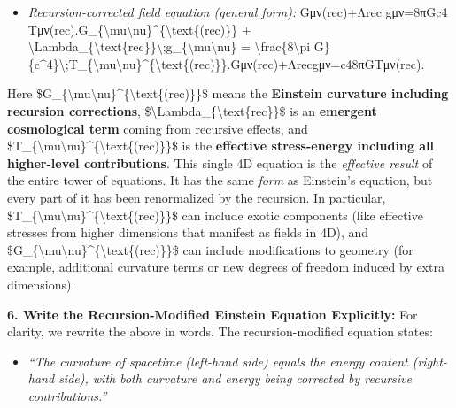\documentclass[
]{article}
\begin{document}
\begin{itemize}
\item
  \emph{Recursion-corrected field equation (general form):}
  Gμν(rec)+Λrec  gμν=8πGc4  Tμν(rec).G\_\{\textbackslash mu\textbackslash nu\}\^{}\{\textbackslash text\{(rec)\}\}
  +
  \textbackslash Lambda\_\{\textbackslash text\{rec\}\}\textbackslash;g\_\{\textbackslash mu\textbackslash nu\}
  = \textbackslash frac\{8\textbackslash pi
  G\}\{c\^{}4\}\textbackslash;T\_\{\textbackslash mu\textbackslash nu\}\^{}\{\textbackslash text\{(rec)\}\}.Gμν(rec)\hspace{0pt}+Λrec\hspace{0pt}gμν\hspace{0pt}=c48πG\hspace{0pt}Tμν(rec)\hspace{0pt}.
\end{itemize}

Here
\$G\_\{\textbackslash mu\textbackslash nu\}\^{}\{\textbackslash text\{(rec)\}\}\$
means the \textbf{Einstein curvature including recursion corrections},
\$\textbackslash Lambda\_\{\textbackslash text\{rec\}\}\$ is an
\textbf{emergent cosmological term} coming from recursive effects, and
\$T\_\{\textbackslash mu\textbackslash nu\}\^{}\{\textbackslash text\{(rec)\}\}\$
is the \textbf{effective stress-energy including all higher-level
contributions}\hspace{0pt}. This single 4D equation is the
\emph{effective result} of the entire tower of equations. It has the
same \emph{form} as Einstein's equation, but every part of it has been
renormalized by the recursion. In particular,
\$T\_\{\textbackslash mu\textbackslash nu\}\^{}\{\textbackslash text\{(rec)\}\}\$
can include exotic components (like effective stresses from higher
dimensions that manifest as fields in 4D), and
\$G\_\{\textbackslash mu\textbackslash nu\}\^{}\{\textbackslash text\{(rec)\}\}\$
can include modifications to geometry (for example, additional curvature
terms or new degrees of freedom induced by extra dimensions).

\textbf{6. Write the Recursion-Modified Einstein Equation Explicitly:}
For clarity, we rewrite the above in words. The recursion-modified
equation states\hspace{0pt}:

\begin{itemize}
\item
  \emph{``The curvature of spacetime (left-hand side) equals the energy
  content (right-hand side), with both curvature and energy being
  corrected by recursive contributions.''}
\end{itemize}
\end{document}
